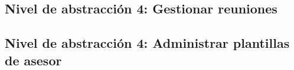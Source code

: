 \subsection{Nivel de abstracción 4: Gestionar reuniones}



\subsection{Nivel de abstracción 4: Administrar plantillas de asesor}

